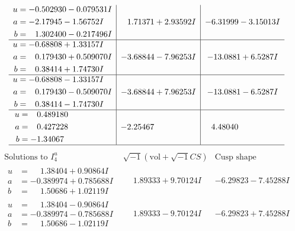 \documentclass[1p]{elsarticle_modified}
\theoremstyle{definition}
\newcommand{\I}{\sqrt{-1}}
\begin{document}
$$\begin{array}{c|c|c}
\begin{aligned}
u &= -0.502930 - 0.079531 I \\
a &= -2.17945 - 1.56752 I \\
b &= \phantom{-}1.302400 - 0.217496 I\end{aligned}
 & \phantom{-}1.71371 + 2.93592 I & -6.31999 - 3.15013 I \\ \hline\begin{aligned}
u &= -0.68808 + 1.33157 I \\
a &= \phantom{-}0.179430 + 0.509070 I \\
b &= \phantom{-}0.38414 + 1.74730 I\end{aligned}
 & -3.68844 - 7.96253 I & -13.0881 + 6.5287 I \\ \hline\begin{aligned}
u &= -0.68808 - 1.33157 I \\
a &= \phantom{-}0.179430 - 0.509070 I \\
b &= \phantom{-}0.38414 - 1.74730 I\end{aligned}
 & -3.68844 + 7.96253 I & -13.0881 - 6.5287 I \\ \hline\begin{aligned}
u &= \phantom{-}0.489180\phantom{ +0.000000I} \\
a &= \phantom{-}0.427228\phantom{ +0.000000I} \\
b &= -1.34067\phantom{ +0.000000I}\end{aligned}
 & -2.25467\phantom{ +0.000000I} & \phantom{-}4.48040\phantom{ +0.000000I}\\
 \hline 
 \end{array}$$\newpage$$\begin{array}{c|c|c}  
\text{Solutions to }I^u_{4}& \I (\text{vol} + \sqrt{-1}CS) & \text{Cusp shape}\\
 \hline 
\begin{aligned}
u &= \phantom{-}1.38404 + 0.90864 I \\
a &= -0.389974 + 0.785688 I \\
b &= \phantom{-}1.50686 + 1.02119 I\end{aligned}
 & \phantom{-}1.89333 + 9.70124 I & -6.29823 - 7.45288 I \\ \hline\begin{aligned}
u &= \phantom{-}1.38404 - 0.90864 I \\
a &= -0.389974 - 0.785688 I \\
b &= \phantom{-}1.50686 - 1.02119 I\end{aligned}
 & \phantom{-}1.89333 - 9.70124 I & -6.29823 + 7.45288 I \\ \hline\begin{aligned}

\end{aligned}
\end{array}$$
\end{document}
